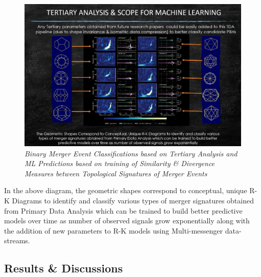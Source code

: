  \begin{figure}[H]
	\centering
	\includegraphics[width=1.0\linewidth]{images/79_Tertiary Analysis & ML Predictions.jpg}
	\caption{\textit{Binary Merger Event Classifications based on Tertiary Analysis and ML Predictions based on training of Similarity \& Divergence Measures between Topological Signatures of Merger Events }}
	\label{fig:LIGO18_PlaceHolder_fig}
\end{figure}

In the above diagram, the geometric shapes correspond to conceptual, unique R-K Diagrams to identify and classify various types of merger signatures obtained from Primary Data Analysis which can be trained to build better predictive models over time as number of observed signals grow exponentially along with the addition of new parameters to R-K models using Multi-messenger data-streams. 


\subsection{Results \& Discussions}

